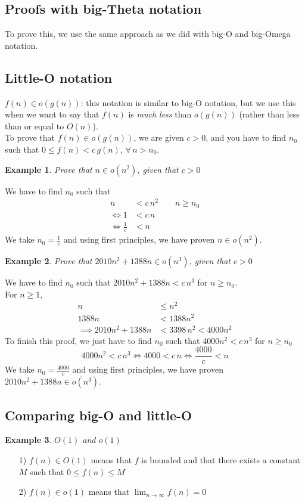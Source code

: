 \documentclass{report}
\newtheorem{ex}{Example}[section]
\begin{document}
\subsection{Proofs with big-Theta notation}
To prove this, we use the same approach as we did with big-O and big-Omega notation.

\subsection{Little-O notation}
$f(n) \in o(g(n))$: this notation is similar to big-O notation, but we use this when we want to say that $f(n)$ is \textit{much less} than $o(g(n))$ (rather than less than or equal to $O(n)$).\\
To prove that $f(n) \in o(g(n))$, we are given $c > 0$, and you have to find $n_0$ such that $0 \leq f(n) < c\,g(n)$, $\forall\, n > n_0$.
\begin{ex}
Prove that $n \in o(n^2)$, given that $c > 0$
\end{ex}
\noindent We have to find $n_0$ such that
\begin{align}
n &< c\,n^2 \qquad n \geq n_0 \\
\iff 1 &< c\,n \\
\iff \frac{1}{c} &< n
\end{align}
We take $n_0 = \frac{1}{c}$ and using first principles, we have proven $n \in o(n^2)$.

\begin{ex}
Prove that $2010n^2 + 1388n \in o(n^3)$, given that $c > 0$
\end{ex}
\noindent We have to find $n_0$ such that $2010n^2 + 1388n < c\,n^3$ for $n \geq n_0$.\\For $n \geq 1,$
\begin{align}
n &\leq n^2 \\
1388n &< 1388n^2 \\
\implies 2010n^2 + 1388n &< 3398\,n^2 < 4000n^2
\end{align}
To finish this proof, we just have to find $n_0$ such that 4000$n^2 < c\,n^3$ for $n \geq n_0$
\begin{equation}
4000n^2 < c\,n^3 \iff 4000 < c\,n \iff \frac{4000}{c} < n
\end{equation}
We take $n_0 = \frac{4000}{c}$ and using first principles, we have proven $2010n^2 + 1388n \in o(n^3)$.

\subsection{Comparing big-O and little-O}
\begin{ex}
$O(1)$ and $o(1)$
\end{ex}
\begin{itemize}
\item[1)] $f(n) \in O(1)$ means that $f$ is bounded and that there exists a constant $M$ such that $0 \leq f(n) \leq M$
\item[2)] $f(n) \in o(1)$ means that $\displaystyle \lim_{n \to \infty} f(n) = 0$
\end{itemize}
\newpage
\end{document}
